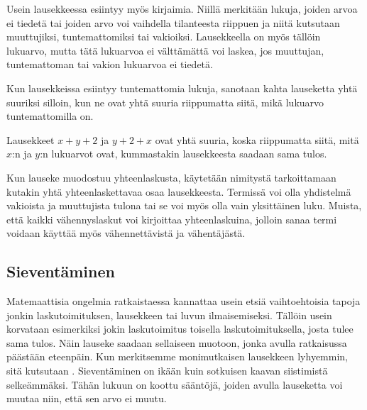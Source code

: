 Usein lausekkeessa esiintyy myös kirjaimia. Niillä merkitään lukuja, joiden arvoa ei tiedetä tai joiden arvo voi vaihdella tilanteesta riippuen ja niitä kutsutaan muuttujiksi, tuntemattomiksi tai vakioiksi. Lausekkeella on myös tällöin lukuarvo, mutta tätä lukuarvoa ei välttämättä voi laskea, jos muuttujan, tuntemattoman tai vakion lukuarvoa ei tiedetä. %

Kun lausekkeissa esiintyy tuntemattomia lukuja, sanotaan kahta lauseketta yhtä suuriksi silloin, kun ne ovat yhtä suuria riippumatta siitä, mikä lukuarvo tuntemattomilla on.

\begin{esimerkki}
Lausekkeet $x+y+2$ ja $y+2+x$ ovat yhtä suuria, koska riippumatta siitä, mitä $x$:n ja $y$:n lukuarvot ovat, kummastakin lausekkeesta saadaan sama tulos.
\end{esimerkki}

Kun lauseke muodostuu yhteenlaskusta, käytetään nimitystä  tarkoittamaan kutakin yhtä yhteenlaskettavaa osaa lausekkeesta. Termissä voi olla yhdistelmä vakioista ja muuttujista tulona tai se voi myös olla vain yksittäinen luku. Muista, että kaikki vähennyslaskut voi kirjoittaa yhteenlaskuina, jolloin sanaa termi voidaan käyttää myös vähennettävistä ja vähentäjästä.

\begin{esimerkki}
\end{esimerkki}


\subsection{Sieventäminen}

Matemaattisia ongelmia ratkaistaessa kannattaa usein etsiä vaihtoehtoisia tapoja jonkin laskutoimituksen, lausekkeen tai luvun ilmaisemiseksi. Tällöin usein korvataan esimerkiksi jokin laskutoimitus toisella laskutoimituksella, josta tulee sama tulos. Näin lauseke saadaan sellaiseen muotoon, jonka avulla ratkaisussa päästään eteenpäin. Kun merkitsemme monimutkaisen lausekkeen lyhyemmin, sitä kutsutaan . Sieventäminen on ikään kuin sotkuisen kaavan siistimistä selkeämmäksi. Tähän lukuun on koottu sääntöjä, joiden avulla lauseketta voi muutaa niin, että sen arvo ei muutu. %

